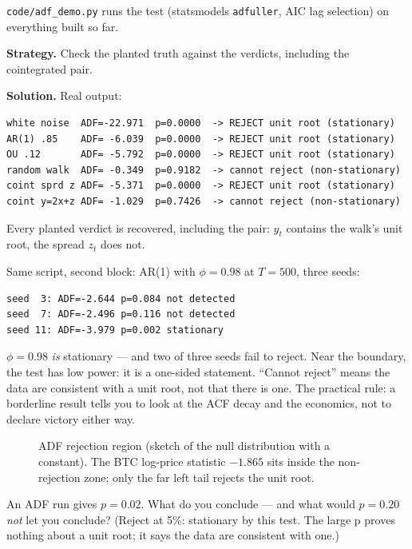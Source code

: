\begin{example}\label{ex:adf}
\texttt{code/adf\_demo.py} runs the test (statsmodels
\texttt{adfuller}, AIC lag selection) on everything built so far.

\textbf{Strategy.} Check the planted truth against the verdicts,
including the cointegrated pair.

\textbf{Solution.} Real output:
\begin{lstlisting}[numbers=none]
white noise  ADF=-22.971  p=0.0000  -> REJECT unit root (stationary)
AR(1) .85    ADF= -6.039  p=0.0000  -> REJECT unit root (stationary)
OU .12       ADF= -5.792  p=0.0000  -> REJECT unit root (stationary)
random walk  ADF= -0.349  p=0.9182  -> cannot reject (non-stationary)
coint sprd z ADF= -5.371  p=0.0000  -> REJECT unit root (stationary)
coint y=2x+z ADF= -1.029  p=0.7426  -> cannot reject (non-stationary)
\end{lstlisting}
Every planted verdict is recovered, including the pair: $y_t$
contains the walk's unit root, the spread $z_t$ does not.
\end{example}

\begin{example}
\label{ex:adfpow}
Same script, second block: AR(1) with $\phi=0.98$ at $T=500$, three
seeds:
\begin{lstlisting}[numbers=none]
seed  3: ADF=-2.644 p=0.084 not detected
seed  7: ADF=-2.496 p=0.116 not detected
seed 11: ADF=-3.979 p=0.002 stationary
\end{lstlisting}
$\phi=0.98$ \emph{is} stationary --- and two of three seeds fail to
reject. Near the boundary, the test has low power: it is a one-sided
statement. ``Cannot reject'' means the data are consistent with a
unit root, not that there is one. The practical rule: a borderline
result tells you to look at the ACF decay and the economics, not to
declare victory either way.
\end{example}

\begin{figure}[ht]\centering

\caption{ADF rejection region (sketch of the null distribution with
a constant). The BTC log-price statistic $-1.865$ sits inside the
non-rejection zone; only the far left tail rejects the unit root.}
\label{fig:adfsketch}
\end{figure}

\begin{checkpoint}
An ADF run gives $p=0.02$. What do you conclude --- and what would
$p=0.20$ \emph{not} let you conclude? (Reject at 5\%: stationary by
this test. The large p proves nothing about a unit root; it says the
data are consistent with one.)
\end{checkpoint}

